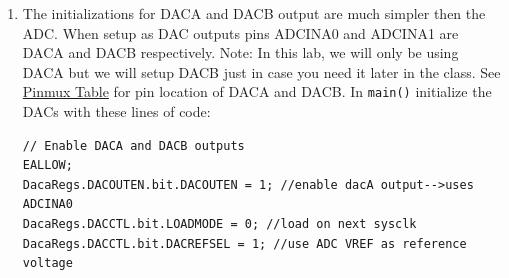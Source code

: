 \documentclass[11pt]{article}
\begin{document}
\begin{enumerate}
\begin{verbatim}
//ADCD
AdcdRegs.ADCSOC0CTL.bit.CHSEL = ???; // set SOC0 to convert pin D0
//sample window is acqps + 1 SYSCLK cycles = 500ns
AdcdRegs.ADCSOC0CTL.bit.ACQPS = 99;
// EPWM4 ADCSOCA will trigger SOC0
AdcdRegs.ADCSOC0CTL.bit.TRIGSEL = ???;
AdcdRegs.ADCSOC1CTL.bit.CHSEL = ???; //set SOC1 to convert pin D1
//sample window is acqps + 1 SYSCLK cycles = 500ns
AdcdRegs.ADCSOC1CTL.bit.ACQPS = 99;
// EPWM4 ADCSOCA will trigger SOC1
AdcdRegs.ADCSOC1CTL.bit.TRIGSEL = ???;
//AdcdRegs.ADCSOC2CTL.bit.CHSEL = ???; //set SOC2 to convert pin D2
//sample window is acqps + 1 SYSCLK cycles = 500ns
//AdcdRegs.ADCSOC2CTL.bit.ACQPS = 99;
// EPWM4 ADCSOCA will trigger SOC2
//AdcdRegs.ADCSOC2CTL.bit.TRIGSEL = ???;
//AdcdRegs.ADCSOC3CTL.bit.CHSEL = ???; //set SOC3 to convert pin D3
//sample window is acqps + 1 SYSCLK cycles = 500ns
//AdcdRegs.ADCSOC3CTL.bit.ACQPS = 99;
// EPWM4 ADCSOCA will trigger SOC3
//AdcdRegs.ADCSOC3CTL.bit.TRIGSEL = ???;
//set to SOC1, the last converted, and it will set INT1 flag ADCD1
AdcdRegs.ADCINTSEL1N2.bit.INT1SEL = ???;
AdcdRegs.ADCINTSEL1N2.bit.INT1E = 1; //enable INT1 flag
AdcdRegs.ADCINTFLGCLR.bit.ADCINT1 = 1; //make sure INT1 flag is cleared
EDIS;
\end{verbatim}
        \item The initializations for DACA and DACB output are much simpler then the ADC. When setup as DAC outputs pins ADCINA0 and ADCINA1 are DACA and DACB respectively. Note: In this lab, we will only be using DACA but we will setup DACB just in case you need it later in the class. See \href{http://coecsl.ece.illinois.edu/se423/Lab_PinMuxTableF28379DLaunchPadSE423Robot.pdf}{Pinmux Table} for pin location of DACA and DACB. In \texttt{main()} initialize the DACs with these lines of code:
\begin{verbatim}
// Enable DACA and DACB outputs
EALLOW;
DacaRegs.DACOUTEN.bit.DACOUTEN = 1; //enable dacA output-->uses ADCINA0
DacaRegs.DACCTL.bit.LOADMODE = 0; //load on next sysclk
DacaRegs.DACCTL.bit.DACREFSEL = 1; //use ADC VREF as reference voltage


\end{verbatim}
\end{enumerate}
\end{document}
